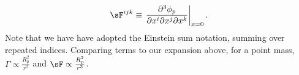 \begin{equation}
\sF^{ijk} \equiv  \left. \frac{\partial^3 \phi_p}{\partial x^i \partial x^j \partial x^k} \right|_{x=0}.
\end{equation}
Note that we have have adopted the Einstein sum notation, summing over repeated indices. Comparing terms to our expansion above, for a point mass,
$\Gamma \propto \frac{R_p^2}{r^2}$ and $\sF \propto \frac{R_p^2}{r^3}$.